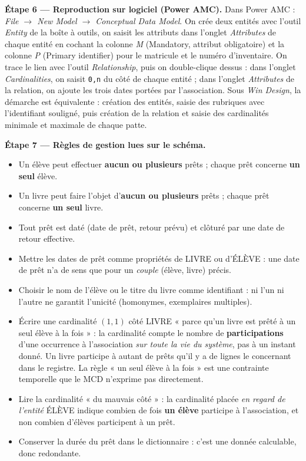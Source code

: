 \documentclass[11pt]{article}
\begin{document}
\begin{exoresolu}
\textbf{Étape 6 — Reproduction sur logiciel (Power AMC).} Dans Power AMC : \emph{File $\rightarrow$ New Model $\rightarrow$ Conceptual Data Model}. On crée deux entités avec l'outil \emph{Entity} de la boîte à outils, on saisit les attributs dans l'onglet \emph{Attributes} de chaque entité en cochant la colonne \emph{M} (Mandatory, attribut obligatoire) et la colonne \emph{P} (Primary identifier) pour le matricule et le numéro d'inventaire. On trace le lien avec l'outil \emph{Relationship}, puis on double-clique dessus : dans l'onglet \emph{Cardinalities}, on saisit \texttt{0,n} du côté de chaque entité ; dans l'onglet \emph{Attributes} de la relation, on ajoute les trois dates portées par l'association. Sous \emph{Win Design}, la démarche est équivalente : création des entités, saisie des rubriques avec l'identifiant souligné, puis création de la relation et saisie des cardinalités minimale et maximale de chaque patte.

\textbf{Étape 7 — Règles de gestion lues sur le schéma.}

\begin{itemize}
\item Un élève peut effectuer \textbf{aucun ou plusieurs} prêts ; chaque prêt concerne \textbf{un seul} élève.
\item Un livre peut faire l'objet d'\textbf{aucun ou plusieurs} prêts ; chaque prêt concerne \textbf{un seul} livre.
\item Tout prêt est daté (date de prêt, retour prévu) et clôturé par une date de retour effective.
\end{itemize}
\end{exoresolu}

\begin{attention}
\begin{itemize}
\item Mettre les dates de prêt comme propriétés de LIVRE ou d'ÉLÈVE : une date de prêt n'a de sens que pour un \emph{couple} (élève, livre) précis.
\item Choisir le nom de l'élève ou le titre du livre comme identifiant : ni l'un ni l'autre ne garantit l'unicité (homonymes, exemplaires multiples).
\item Écrire une cardinalité $(1,1)$ côté LIVRE « parce qu'un livre est prêté à un seul élève à la fois » : la cardinalité compte le nombre de \textbf{participations} d'une occurrence à l'association \emph{sur toute la vie du système}, pas à un instant donné. Un livre participe à autant de prêts qu'il y a de lignes le concernant dans le registre. La règle « un seul élève à la fois » est une contrainte temporelle que le MCD n'exprime pas directement.
\item Lire la cardinalité « du mauvais côté » : la cardinalité placée \emph{en regard de l'entité} ÉLÈVE indique combien de fois \textbf{un élève} participe à l'association, et non combien d'élèves participent à un prêt.
\item Conserver la durée du prêt dans le dictionnaire : c'est une donnée calculable, donc redondante.
\end{itemize}
\end{attention}
\end{document}
